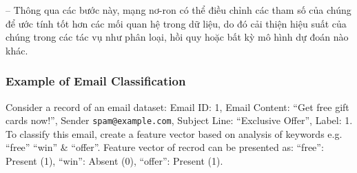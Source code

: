 \documentclass{article}
\begin{document}
-- Thông qua các bước này, mạng nơ-ron có thể điều chỉnh các tham số của chúng để ước tính tốt hơn các mối quan hệ trong dữ liệu, do đó cải thiện hiệu suất của chúng trong các tác vụ như phân loại, hồi quy hoặc bất kỳ mô hình dự đoán nào khác.


\subsubsection{Example of Email Classification}
Consider a record of an email dataset: Email ID: 1, Email Content: ``Get free gift cards now!'', Sender {\tt spam@example.com}, Subject Line: ``Exclusive Offer'', Label: 1. To classify this email, create a feature vector based on analysis of keywords e.g. ``free'' ``win'' \& ``offer''. Feature vector of recrod can be presented as: ``free'': Present (1), ``win'': Absent (0), ``offer'': Present (1).
\end{document}
